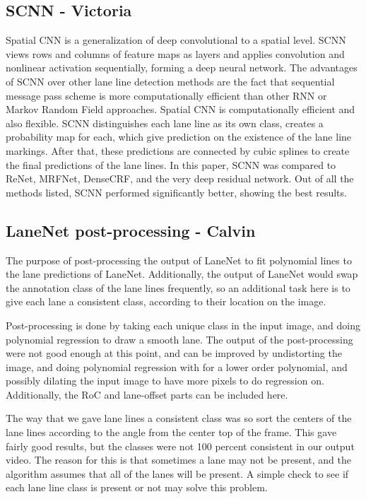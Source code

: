 \documentclass[twoside,twocolumn]{article}
\begin{document}
\subsection{SCNN - Victoria}
\par Spatial CNN is a generalization of deep convolutional to a spatial level. SCNN views rows and columns of feature maps as layers and applies convolution and nonlinear activation sequentially, forming a deep neural network. The advantages of SCNN over other lane line detection methods are the fact that sequential message pass scheme is more computationally efficient than other RNN or Markov Random Field approaches. Spatial CNN is computationally efficient and also flexible. SCNN distinguishes each lane line as its own class, creates a probability map for each, which give prediction on the existence of the lane line markings. After that, these predictions are connected by cubic splines to create the final predictions of the lane lines. In this paper, SCNN was compared to ReNet, MRFNet, DenseCRF, and the very deep residual network. Out of all the methods listed, SCNN performed significantly better, showing the best results.



\subsection{LaneNet post-processing - Calvin}
\par The purpose of post-processing the output of LaneNet to fit polynomial lines to the lane predictions of LaneNet. Additionally, the output of LaneNet would swap the annotation class of the lane lines frequently, so an additional task here is to give each lane a consistent class, according to their location on the image.
\par Post-processing is done by taking each unique class in the input image, and doing polynomial regression to draw a smooth lane. The output of the post-processing were not good enough at this point, and can be improved by undistorting the image, and doing polynomial regression with for a lower order polynomial, and possibly dilating the input image to have more pixels to do regression on. Additionally, the RoC and lane-offset parts can be included here.
\par The way that we gave lane lines a consistent class was so sort the centers of the lane lines according to the angle from the center top of the frame. This gave fairly good results, but the classes were not 100 percent consistent in our output video. The reason for this is that sometimes a lane may not be present, and the algorithm assumes that all of the lanes will be present. A simple check to see if each lane line class is present or not may solve this problem.
\end{document}
